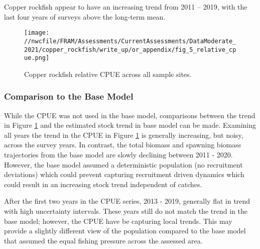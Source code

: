 \documentclass[11pt,
  english,
  a4paper,
]{article}
\begin{document}
\tagmcend\tagstructend


Copper rockfish appear to have an increasing trend from 2011 -- 2019, with the last four years of surveys above the long-term mean.

\leavevmode\tagmcend\tagstructend\par


\begin{figure}
\centering
\texttt{[image: //nwcfile/FRAM/Assessments/CurrentAssessments/DataModerate\_2021/copper\_rockfish/write\_up/or\_appendix/fig\_5\_relative\_cpue.png]}
\caption{Copper rockfish relative CPUE across all sample sites.\label{fig:fig-5}}
\end{figure}

\tagmcend\tagstructend


\hypertarget{comparison-to-the-base-model}{%
\subsubsection{Comparison to the Base Model}\label{comparison-to-the-base-model}}

\leavevmode\tagmcend\tagstructend


While the CPUE was not used in the base model, comparisons between the trend in Figure \ref{fig:fig-5} and the estimated stock trend in base model can be made. Examining all years the trend in the CPUE in Figure \ref{fig:fig-5} is generally increasing, but noisy, across the survey years. In contrast, the total biomass and spawning biomass trajectories from the base model are slowly declining between 2011 - 2020. However, the base model assumed a deterministic population (no recruitment deviations) which could prevent capturing recruitment driven dynamics which could result in an increasing stock trend independent of catches.

\leavevmode\tagmcend\tagstructend\par


After the first two years in the CPUE series, 2013 - 2019, generally flat in trend with high uncertainty intervals. These years still do not match the trend in the base model; however, the CPUE have be capturing local trends. This may provide a slightly different view of the population compared to the base model that assumed the equal fishing pressure across the assessed area.

\leavevmode\tagmcend\tagstructend\par
\end{document}
